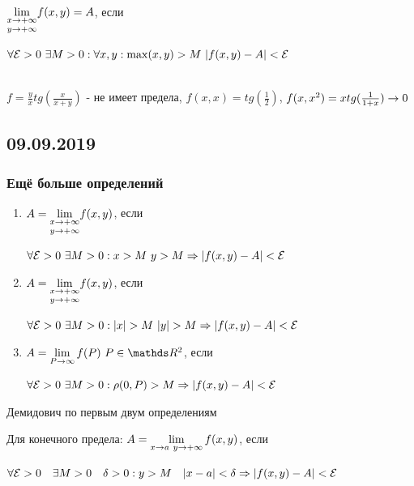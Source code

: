 \documentclass[12pt, fleqn]{article}
\begin{document}
\begin{definition}\\
    $\underset{y \rightarrow +\infty}{\lim\limits_{x \rightarrow +\infty}} f(x,y)=A$, если 
    
    $\forall \mathcal{E}>0 \ \exists M>0: \forall x,y: \max(x,y)>M \ |f(x,y)-A|<\mathcal{E}$
\end{definition}

\begin{example}\\
    $f=\frac{y}{x} tg(\frac{x}{x+y})$ - не имеет предела, $f(x,x)=tg(\frac{1}{2})$, $f(x,x^2)=x tg(\frac{1}{1+x}) \rightarrow 0$
\end{example}

\newpage
\subsection{09.09.2019}
\subsubsection{Ещё больше определений}
\begin{definition}
\begin{enumerate}
        \item $A=\underset{y \rightarrow +\infty}{\lim\limits_{x \rightarrow +\infty}} f(x,y)$, если 
        
        $\forall \E>0 \ \e M>0: x>M \ y>M \Ra |f(x,y)-A| < \E$
        \item $A=\underset{y \rightarrow +\infty}{\lim\limits_{x \rightarrow +\infty}} f(x,y)$, если 
        
        $\forall \E>0 \ \e M>0: |x|>M \ |y|>M \Ra |f(x,y)-A| < \E$
        \item $A=\lim\limits_{P \ra \infty} f(P) \ P \in \R^2$, если 
        
        $\forall \mathcal{E}>0 \ \exists M>0: \rho(0, P)>M \Rightarrow |f(x,y)-A| < \mathcal{E}$
    \end{enumerate}
\end{definition}

\begin{remark}
    Демидович по первым двум определениям
\end{remark}

\begin{definition}
    Для конечного предела: $A=\lim\limits_{x \rightarrow a \  y \rightarrow +\infty} f(x,y)$, если 
    
    $\forall \mathcal{E}>0 \quad \exists M>0 \quad \delta > 0: y>M \quad |x-a| < \delta \Rightarrow |f(x,y)-A| < \mathcal{E}$
\end{definition}
\end{document}
